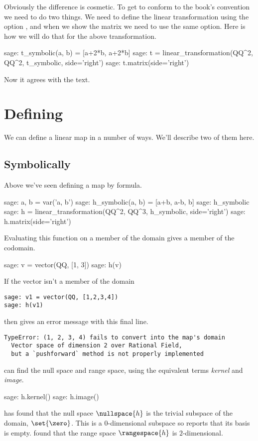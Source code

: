 Obviously the difference is cosmetic.
To get \Sage{} to conform to the book's convention we need to do two 
things.
We need to define the linear transformation using the
option , and when we show the
matrix we need to use the same option.
Here is how we will do that for the above transformation.
\begin{sagecommandline}
sage: t_symbolic(a, b) = [a+2*b, a+2*b]         
sage: t = linear_transformation(QQ^2, QQ^2, t_symbolic, side='right')  
sage: t.matrix(side='right')
\end{sagecommandline}
Now it agrees with the text.


  

\section{Defining}
We can define a linear map in a number of ways.
We'll describe two of them here.

\subsection{Symbolically}
Above we've seen defining a map by formula.
\begin{sagecommandline}
sage: a, b = var('a, b')   
sage: h_symbolic(a, b) = [a+b, a-b, b]         
sage: h_symbolic       
sage: h = linear_transformation(QQ^2, QQ^3, h_symbolic, side='right')
sage: h.matrix(side='right') 
\end{sagecommandline}
Evaluating this function on a member of the domain gives a member
of the codomain. 
\begin{sagecommandline}
sage: v = vector(QQ, [1, 3])  
sage: h(v)
\end{sagecommandline}

If the vector isn't a member of the domain
\begin{lstlisting}
sage: v1 = vector(QQ, [1,2,3,4])
sage: h(v1)
\end{lstlisting}
then \Sage{} gives an error message
with this final line.
\begin{lstlisting}
TypeError: (1, 2, 3, 4) fails to convert into the map's domain 
  Vector space of dimension 2 over Rational Field, 
  but a `pushforward` method is not properly implemented
\end{lstlisting}

\Sage{} can find the null space 
and range space, using the equivalent 
terms \textit{kernel} and \textit{image}.
\begin{sagecommandline}
sage: h.kernel()                                       
sage: h.image()                                        
\end{sagecommandline}
\Sage{} has found that 
the null space $\nullspace{h}$ is the trivial subspace of the domain,
$\set{\zero}$.
This is a $0$-dimensional
subspace so \Sage{} reports that its basis is empty.
\Sage{} found that the range space $\rangespace{h}$ is $2$-dimensional. 

